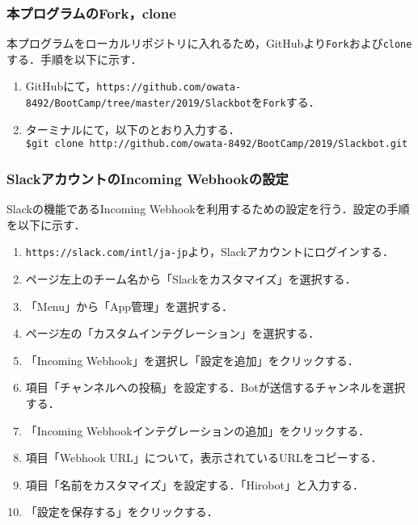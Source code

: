 \documentclass[12pt]{jsarticle}
\begin{document}
\subsubsection{本プログラムのFork，clone}
本プログラムをローカルリポジトリに入れるため，GitHubより\verb|Fork|および\verb|clone|する．手順を以下に示す．

\begin{enumerate}
\item GitHubにて，\verb|https://github.com/owata-8492/BootCamp/tree/master/2019/Slackbot|を\verb|Fork|する．
\item ターミナルにて，以下のとおり入力する．\\
  \verb|$git clone http://github.com/owata-8492/BootCamp/2019/Slackbot.git|
\end{enumerate}

\subsubsection{SlackアカウントのIncoming Webhookの設定}\label{subsubsec:webhook}
Slackの機能であるIncoming Webhook\cite{slack-incoming}を利用するための設定を行う．設定の手順を以下に示す．
\begin{enumerate}
\item \verb|https://slack.com/intl/ja-jp|より，Slackアカウントにログインする．
\item ページ左上のチーム名から「Slackをカスタマイズ」を選択する．
\item 「Menu」から「App管理」を選択する．
\item ページ左の「カスタムインテグレーション」を選択する．\label{it:step4}
\item 「Incoming Webhook」を選択し「設定を追加」をクリックする．
\item 項目「チャンネルへの投稿」を設定する．Botが送信するチャンネルを選択する．
\item 「Incoming Webhookインテグレーションの追加」をクリックする．
\item 項目「Webhook URL」について，表示されているURLをコピーする．\label{it:step8}
\item 項目「名前をカスタマイズ」を設定する．「Hirobot」と入力する．
\item 「設定を保存する」をクリックする．
\end{enumerate}
\end{document}

